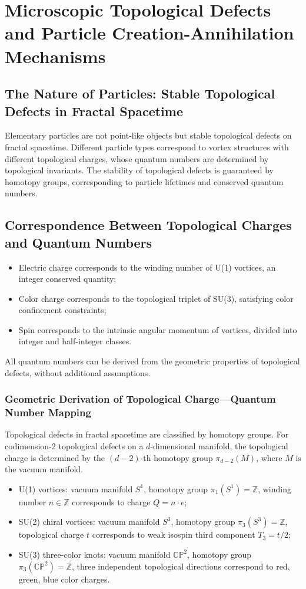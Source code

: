 \documentclass[12pt,a4paper,twocolumn]{article}
\begin{document}
\section{Microscopic Topological Defects and Particle Creation-Annihilation Mechanisms}

\subsection{The Nature of Particles: Stable Topological Defects in Fractal Spacetime}
Elementary particles are not point-like objects but stable topological defects on fractal spacetime. Different particle types correspond to vortex structures with different topological charges, whose quantum numbers are determined by topological invariants. The stability of topological defects is guaranteed by homotopy groups, corresponding to particle lifetimes and conserved quantum numbers.

\subsection{Correspondence Between Topological Charges and Quantum Numbers}
\begin{itemize}
\item Electric charge corresponds to the winding number of U(1) vortices, an integer conserved quantity;
\item Color charge corresponds to the topological triplet of SU(3), satisfying color confinement constraints;
\item Spin corresponds to the intrinsic angular momentum of vortices, divided into integer and half-integer classes.
\end{itemize}
All quantum numbers can be derived from the geometric properties of topological defects, without additional assumptions.

\subsubsection{Geometric Derivation of Topological Charge---Quantum Number Mapping}
Topological defects in fractal spacetime are classified by homotopy groups. For codimension-2 topological defects on a $d$-dimensional manifold, the topological charge is determined by the $(d-2)$-th homotopy group $\pi_{d-2}(M)$, where $M$ is the vacuum manifold.
\begin{itemize}
\item U(1) vortices: vacuum manifold $S^1$, homotopy group $\pi_1(S^1)=\mathbb{Z}$, winding number $n\in\mathbb{Z}$ corresponds to charge $Q=n\cdot e$;
\item SU(2) chiral vortices: vacuum manifold $S^3$, homotopy group $\pi_3(S^3)=\mathbb{Z}$, topological charge $t$ corresponds to weak isospin third component $T_3=t/2$;
\item SU(3) three-color knots: vacuum manifold $\mathbb{CP}^2$, homotopy group $\pi_3(\mathbb{CP}^2)=\mathbb{Z}$, three independent topological directions correspond to red, green, blue color charges.
\end{itemize}
\end{document}
